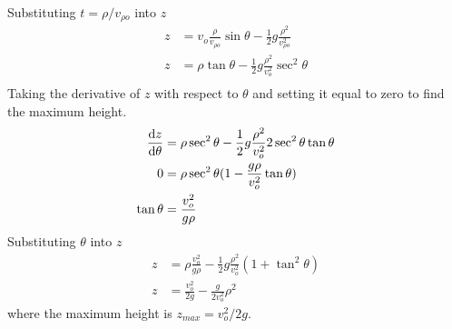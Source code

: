 \documentclass[../problems.tex]{subfiles}
\begin{document}
Substituting $t = \rho/v_{\rho o}$ into $z$
\begin{align*}
    z &= v_o \frac{\rho}{v_{\rho o}} \sin \theta - \frac{1}{2}g \frac{\rho^2}{v_{\rho o}^2} \\
    z &= \rho \tan \theta - \frac{1}{2}g \frac{\rho^2}{v_o^2} \sec^2 \theta \\
\end{align*}
Taking the derivative of $z$ with respect to $\theta$ and setting it equal to zero to find the maximum
height.
\begin{align*}
    \dv{z}{\theta} &= \rho \sec^2\theta - \frac{1}{2}g\frac{\rho^2}{v_o^2} 2\sec^2\theta\tan\theta\\
    0 &= \rho \sec^2\theta(1 - \frac{g\rho}{v_o^2} \tan\theta) \\
    \tan \theta &= \frac{v_o^2}{g\rho}
\end{align*}
Substituting $\theta$ into $z$
\begin{align*}
    z &= \rho \frac{v_o^2}{g\rho} - \frac{1}{2}g \frac{\rho^2}{v_o^2} (1 + \tan^2\theta) \\
    z &= \frac{v_o^2}{2g} - \frac{g}{2v_o^2} \rho^2
\end{align*}
where the maximum height is $z_{max} = v_o^2/2g$.
\end{document}
